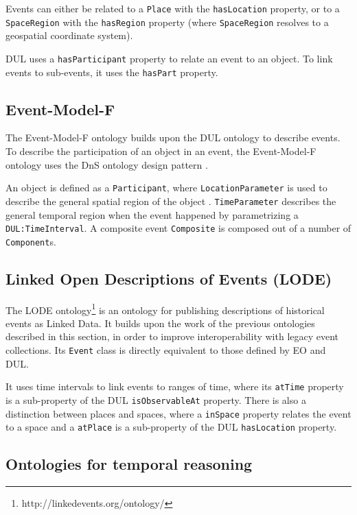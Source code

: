 Events can either be related to a \texttt{Place} with the \texttt{hasLocation} property, or to a \texttt{SpaceRegion} with the \texttt{hasRegion} property (where \texttt{SpaceRegion} resolves to a geospatial coordinate system).

\ac{DUL} uses a \texttt{hasParticipant} property to relate an event to an object. To link events to sub-events, it uses the \texttt{hasPart} property.

\subsection{Event-Model-F}

The Event-Model-F ontology builds upon the \ac{DUL} ontology to describe events. To describe the participation of an object in an event, the Event-Model-F ontology uses the \ac{DnS} ontology design pattern \cite{Shaw2009}. 

An object is defined as a \texttt{Participant}, where \texttt{LocationParameter} is used to describe the general spatial region of the object \cite{Scherp2011}. \texttt{TimeParameter} describes the general temporal region when the event happened by parametrizing a \texttt{DUL:TimeInterval}. A composite event \texttt{Composite} is composed out of a number of \texttt{Component}s.

\subsection{Linked Open Descriptions of Events (LODE)}

The \ac{LODE} ontology\footnote{http://linkedevents.org/ontology/} is an ontology for publishing descriptions of historical events as Linked Data. It builds upon the work of the previous ontologies described in this section, in order to improve interoperability with legacy event collections. Its \texttt{Event} class is directly equivalent to those defined by \ac{EO} and \ac{DUL}. 

It uses time intervals to link events to ranges of time, where its \texttt{atTime} property is a sub-property of the \ac{DUL} \texttt{isObservableAt} property. There is also a distinction between places and spaces, where a \texttt{inSpace} property relates the event to a space and a \texttt{atPlace} is a sub-property of the \ac{DUL} \texttt{hasLocation} property.


\subsection{Ontologies for temporal reasoning}
\label{TemporalReasoning}

